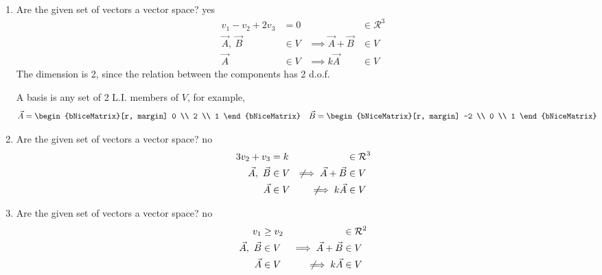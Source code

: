 \begin{enumerate}
\item Are the given set of vectors a vector space? \textcolor{y_h}{yes}
\begin{align}
    v_1 - v_2 + 2v_3           & = 0               &
                               & \in \mathcal{R}^3   \\
    \vec{A},\ \vec{B}          & \in V             &
    \implies \vec{A} + \vec{B} & \in V               \\
    \vec{A}                    & \in V             &
    \implies k\vec{A}          & \in V
\end{align}
The dimension is 2, since the relation between the components has 2 d.o.f. \par
A basis is any set of 2 L.I. members of $ V $, for example,
\begin{align}
\vec{A} & = \begin{bNiceMatrix}[r, margin]
0 \\ 2 \\ 1
\end{bNiceMatrix} &
\vec{B} & = \begin{bNiceMatrix}[r, margin]
-2 \\ 0 \\ 1
\end{bNiceMatrix}
\end{align}

\item Are the given set of vectors a vector space? \textcolor{y_p}{no}
\begin{align}
    3v_2 + v_3                         & = k               &
                                       & \in \mathcal{R}^3   \\
    \vec{A},\ \vec{B}                  & \in V             &
    \not\!\!\implies \vec{A} + \vec{B} & \in V               \\
    \vec{A}                            & \in V             &
    \not\!\!\implies k\vec{A}          & \in V
\end{align}

\item Are the given set of vectors a vector space? \textcolor{y_p}{no}
\begin{align}
    v_1                        & \geq v_2          &
                               & \in \mathcal{R}^2   \\
    \vec{A},\ \vec{B}          & \in V             &
    \implies \vec{A} + \vec{B} & \in V               \\
    \vec{A}                    & \in V             &
    \not\!\!\implies k\vec{A}  & \in V
\end{align}


\end{enumerate}
